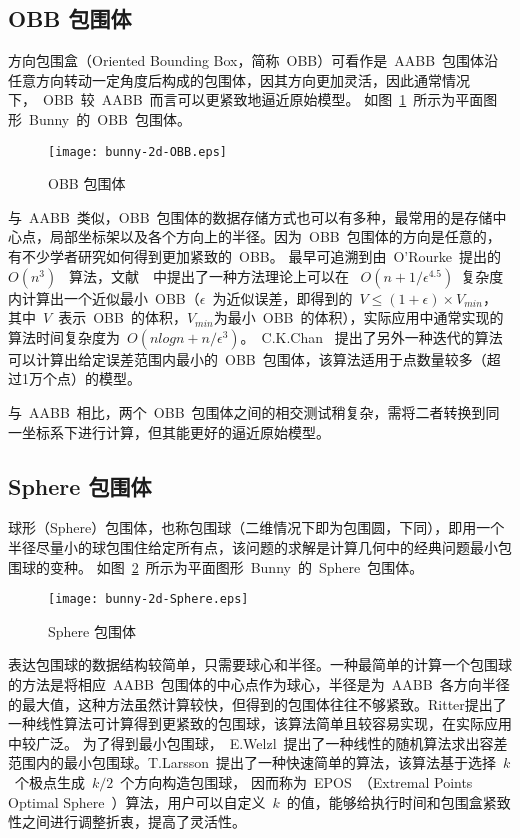 \subsection{OBB 包围体}

方向包围盒（Oriented Bounding Box，简称~OBB）可看作是~AABB~包围体沿任意方向转动一定角度后构成的包围体，因其方向更加灵活，因此通常情况下，~OBB~较~AABB~而言可以更紧致地逼近原始模型。
如图~\ref{fig:obb-bunny}~所示为平面图形~Bunny~的~OBB~包围体。
\begin{figure}[htbp] %
  \centering
  \texttt{[image: bunny-2d-OBB.eps]}
  \caption{OBB 包围体}
  \label{fig:obb-bunny}
\end{figure}

与~AABB~类似，OBB~包围体的数据存储方式也可以有多种，最常用的是存储中心点，局部坐标架以及各个方向上的半径\cite{gottschalk1996obbtree}。因为~OBB~包围体的方向是任意的，有不少学者研究如何得到更加紧致的~OBB。
最早可追溯到由~O'Rourke~\cite{o1985finding}提出的~$O(n^3)$~
算法，文献~~中提出了一种方法理论上可以在~
$O(n+1/\epsilon^{4.5})$~复杂度内计算出一个近似最小~OBB（$\epsilon$~为近似误差，即得到的~$V\leq(1+\epsilon)\times V_{min}$，
其中~$V$~表示~OBB~的体积，$V_{min}$为最小~OBB~的体积），实际应用中通常实现的算法时间复杂度为~$O(nlogn+n/
\epsilon ^{3})$。~C.K.Chan~ \cite{chan2001determination}
提出了另外一种迭代的算法可以计算出给定误差范围内最小的~OBB~包围体，该算法适用于点数量较多（超过1万个点）的模型。

与~AABB~相比，两个~OBB~包围体之间的相交测试稍复杂，需将二者转换到同一坐标系下进行计算，但其能更好的逼近原始模型。

\subsection{Sphere 包围体}

球形（Sphere）包围体，也称包围球（二维情况下即为包围圆，下同），即用一个半径尽量小的球包围住给定所有点，该问题的求解是计算几何中的经典问题最小包围球的变种。
如图~\ref{fig:sphere-bunny}~所示为平面图形~Bunny~的~Sphere~包围体。
\begin{figure}[htbp] %
  \centering
  \texttt{[image: bunny-2d-Sphere.eps]}
  \caption{Sphere 包围体}
  \label{fig:sphere-bunny}
\end{figure}

表达包围球的数据结构较简单，只需要球心和半径。一种最简单的计算一个包围球的方法是将相应~AABB~包围体的中心点作为球心，半径是为~AABB~各方向半径的最大值，这种方法虽然计算较快，但得到的包围体往往不够紧致。Ritter\cite{Ritter1990}提出了一种线性算法可计算得到更紧致的包围球，该算法简单且较容易实现，在实际应用中较广泛。
为了得到最小包围球，~E.Welzl~\cite{Welzl1991Smallest}提出了一种线性的随机算法求出容差范围内的最小包围球。T.Larsson~\cite{larsson2008fast}提出了一种快速简单的算法，该算法基于选择~$k$~个极点生成~$k/2$~个方向构造包围球，
因而称为~EPOS~（Extremal Points Optimal Sphere~）算法，用户可以自定义~$k$~的值，能够给执行时间和包围盒紧致性之间进行调整折衷，提高了灵活性。

